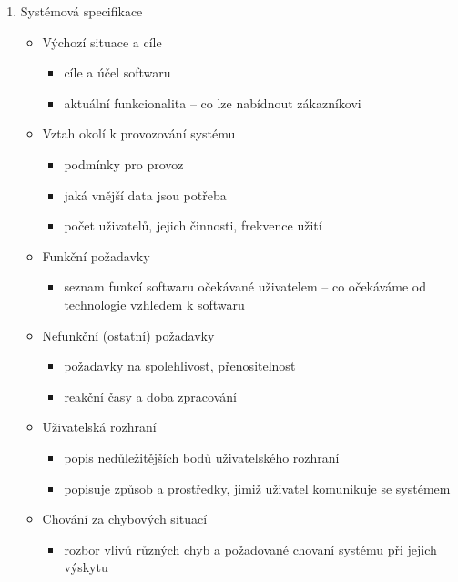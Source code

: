 \begin{enumerate}[label=\arabic*)]
    \item Systémová specifikace
    
    \begin{itemize}
        \item Výchozí situace a cíle
        \begin{itemize}[\tiny {}]
            \item cíle a účel softwaru
            \item aktuální funkcionalita – co lze nabídnout zákazníkovi
        \end{itemize}

        \item Vztah okolí k provozování systému
        \begin{itemize}[\tiny {}]
            \item podmínky pro provoz
            \item jaká vnější data jsou potřeba
            \item počet uživatelů, jejich činnosti, frekvence užití
        \end{itemize}

        \item Funkční požadavky
        \begin{itemize}[\tiny {}]
            \item seznam funkcí softwaru očekávané uživatelem – co očekáváme od technologie vzhledem k softwaru
        \end{itemize}

        \item Nefunkční (ostatní) požadavky
        \begin{itemize}[\tiny {}]
            \item požadavky na spolehlivost, přenositelnost
            \item reakční časy a doba zpracování
        \end{itemize}

        \item Uživatelská rozhraní
        \begin{itemize}[\tiny {}]
            \item popis nedůležitějších bodů uživatelského rozhraní
            \item popisuje způsob a prostředky, jimiž uživatel komunikuje se systémem
        \end{itemize}

        \item Chování za chybových situací
        \begin{itemize}[\tiny {}]
            \item rozbor vlivů různých chyb a požadované chovaní systému při jejich výskytu
        \end{itemize}


\end{itemize}
\end{enumerate}
